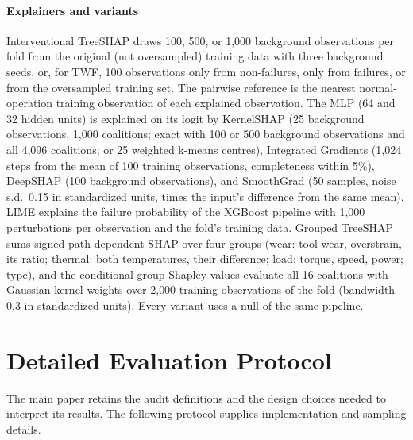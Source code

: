 \documentclass[10pt]{article}
\begin{document}
\paragraph{Explainers and variants} Interventional TreeSHAP draws 100, 500, or 1{,}000 background observations per fold from the original (not oversampled) training data with three background seeds, or, for TWF, 100 observations only from non-failures, only from failures, or from the oversampled training set. The pairwise reference is the nearest normal-operation training observation of each explained observation. The MLP (64 and 32 hidden units) is explained on its logit by KernelSHAP (25 background observations, 1{,}000 coalitions; exact with 100 or 500 background observations and all 4{,}096 coalitions; or 25 weighted k-means centres), Integrated Gradients (1{,}024 steps from the mean of 100 training observations, completeness within 5\%), DeepSHAP (100 background observations), and SmoothGrad (50 samples, noise s.d.\ 0.15 in standardized units, times the input's difference from the same mean). LIME explains the failure probability of the XGBoost pipeline with 1{,}000 perturbations per observation and the fold's training data. Grouped TreeSHAP sums signed path-dependent SHAP over four groups (wear: tool wear, overstrain, its ratio; thermal: both temperatures, their difference; load: torque, speed, power; type), and the conditional group Shapley values evaluate all 16 coalitions with Gaussian kernel weights over 2{,}000 training observations of the fold (bandwidth 0.3 in standardized units). Every variant uses a null of the same pipeline.

\section{Detailed Evaluation Protocol}
\label{sec:protocol}
The main paper retains the audit definitions and the design choices needed to interpret its results. The following protocol supplies implementation and sampling details.
\end{document}
